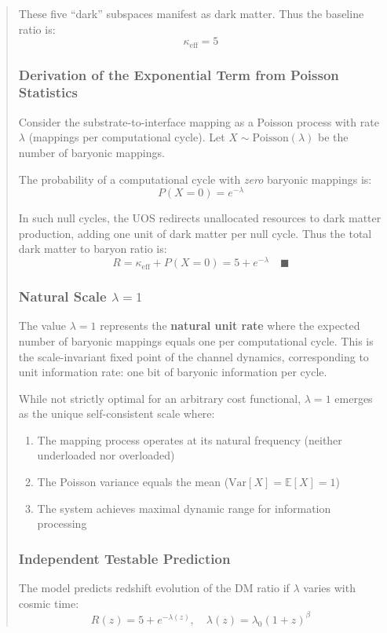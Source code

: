\documentclass[11pt,titlepage]{article}
\begin{document}
\begin{abstract}
These five ``dark'' subspaces manifest as dark matter. Thus the baseline ratio is:
\[
\kappa_{\text{eff}} = 5
\]

\subsubsection{Derivation of the Exponential Term from Poisson Statistics}
Consider the substrate-to-interface mapping as a Poisson process with rate $\lambda$ (mappings per computational cycle). Let $X \sim \text{Poisson}(\lambda)$ be the number of baryonic mappings.

The probability of a computational cycle with \textit{zero} baryonic mappings is:
\[
P(X = 0) = e^{-\lambda}
\]

In such null cycles, the UOS redirects unallocated resources to dark matter production, adding one unit of dark matter per null cycle. Thus the total dark matter to baryon ratio is:
\[
R = \kappa_{\text{eff}} + P(X = 0) = 5 + e^{-\lambda}
\quad \blacksquare
\]

\subsubsection{Natural Scale $\lambda = 1$}
The value $\lambda = 1$ represents the \textbf{natural unit rate} where the expected number of baryonic mappings equals one per computational cycle. This is the scale-invariant fixed point of the channel dynamics, corresponding to unit information rate: one bit of baryonic information per cycle.

While not strictly optimal for an arbitrary cost functional, $\lambda = 1$ emerges as the unique self-consistent scale where:
\begin{enumerate}
    \item The mapping process operates at its natural frequency (neither underloaded nor overloaded)
    \item The Poisson variance equals the mean ($\text{Var}[X] = \mathbb{E}[X] = 1$)
    \item The system achieves maximal dynamic range for information processing
\end{enumerate}

\subsubsection{Independent Testable Prediction}
The model predicts redshift evolution of the DM ratio if $\lambda$ varies with cosmic time:
\[
R(z) = 5 + e^{-\lambda(z)}, \quad \lambda(z) = \lambda_0 (1+z)^{\beta}
\]


\end{abstract}
\end{document}
